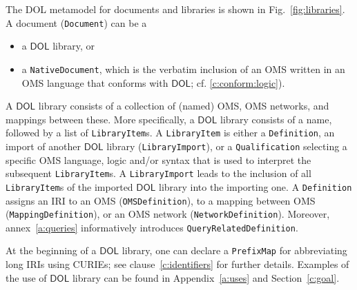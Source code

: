 \documentclass[10pt, a4paper]{isov2}
\makeatletter
\newcommand*{\cf}{cf.\@\xspace}
\newcommand*{\termref}[1]{\index{#1}#1\xspace}
\newcommand*{\syntax}[1]{\texttt{#1}}
\newcommand*{\DOL}{\ensuremath{\mathsf{DOL}}\xspace}
\renewcommand{\clauserefname}{clause}
\renewcommand{\cref}[1]{\clauserefname~\ref{#1}}
\makeatother
\begin{document}

\label{c:libraries}



The DOL metamodel for documents and libraries is shown in Fig.~\ref{fig:libraries}.
A \termref{document} (\syntax{Document}) can be a 
 \begin{itemize} 
\item a \DOL library, or
\item a \syntax{NativeDocument}, which is the verbatim inclusion of an
  OMS written in an OMS language that conforms with \DOL; \cf
  \ref{c:conform:logic}).
 \end{itemize} 
A \DOL library consists of a collection of (named)  OMS,  OMS networks, and mappings between these.  More specifically, a \DOL
library consists of a name, followed by a list of
\syntax{LibraryItem}s.  A \syntax{LibraryItem} is either a
\syntax{Definition},
an import of another \DOL library (\syntax{LibraryImport}),
or a \syntax{Qualification} selecting a specific
OMS language, logic and/or syntax that is used to interpret the
subsequent \syntax{LibraryItem}s.  
 A \syntax{LibraryImport} leads to the inclusion of all \syntax{LibraryItem}s of the imported \DOL library into the importing one.
A \syntax{Definition} assigns an IRI to an OMS  (\syntax{OMSDefinition}), 
to a mapping between OMS (\syntax{MappingDefinition}), or
an OMS network  (\syntax{NetworkDefinition}). Moreover, annex~\ref{a:queries}
informatively introduces \syntax{QueryRelatedDefinition}.

At the beginning of a \DOL library, one can declare a \syntax{PrefixMap} for abbreviating long IRIs  using CURIEs; see \cref{c:identifiers} for further details. Examples of the use of \DOL library can be found in Appendix~\ref{a:uses} and Section~\ref{c:goal}.
\end{document}
